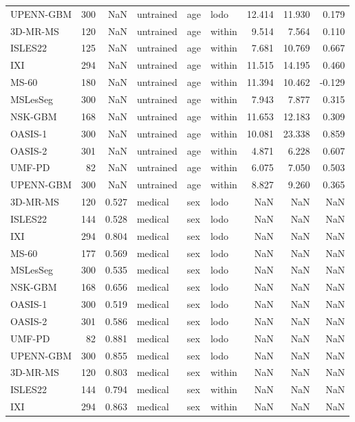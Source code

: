 \begin{tabular}{lrrlllrrr}
UPENN-GBM & 300 & NaN & untrained & age & lodo & 12.414 & 11.930 & 0.179 \\
3D-MR-MS & 120 & NaN & untrained & age & within & 9.514 & 7.564 & 0.110 \\
ISLES22 & 125 & NaN & untrained & age & within & 7.681 & 10.769 & 0.667 \\
IXI & 294 & NaN & untrained & age & within & 11.515 & 14.195 & 0.460 \\
MS-60 & 180 & NaN & untrained & age & within & 11.394 & 10.462 & -0.129 \\
MSLesSeg & 300 & NaN & untrained & age & within & 7.943 & 7.877 & 0.315 \\
NSK-GBM & 168 & NaN & untrained & age & within & 11.653 & 12.183 & 0.309 \\
OASIS-1 & 300 & NaN & untrained & age & within & 10.081 & 23.338 & 0.859 \\
OASIS-2 & 301 & NaN & untrained & age & within & 4.871 & 6.228 & 0.607 \\
UMF-PD & 82 & NaN & untrained & age & within & 6.075 & 7.050 & 0.503 \\
UPENN-GBM & 300 & NaN & untrained & age & within & 8.827 & 9.260 & 0.365 \\
3D-MR-MS & 120 & 0.527 & medical & sex & lodo & NaN & NaN & NaN \\
ISLES22 & 144 & 0.528 & medical & sex & lodo & NaN & NaN & NaN \\
IXI & 294 & 0.804 & medical & sex & lodo & NaN & NaN & NaN \\
MS-60 & 177 & 0.569 & medical & sex & lodo & NaN & NaN & NaN \\
MSLesSeg & 300 & 0.535 & medical & sex & lodo & NaN & NaN & NaN \\
NSK-GBM & 168 & 0.656 & medical & sex & lodo & NaN & NaN & NaN \\
OASIS-1 & 300 & 0.519 & medical & sex & lodo & NaN & NaN & NaN \\
OASIS-2 & 301 & 0.586 & medical & sex & lodo & NaN & NaN & NaN \\
UMF-PD & 82 & 0.881 & medical & sex & lodo & NaN & NaN & NaN \\
UPENN-GBM & 300 & 0.855 & medical & sex & lodo & NaN & NaN & NaN \\
3D-MR-MS & 120 & 0.803 & medical & sex & within & NaN & NaN & NaN \\
ISLES22 & 144 & 0.794 & medical & sex & within & NaN & NaN & NaN \\
IXI & 294 & 0.863 & medical & sex & within & NaN & NaN & NaN \\

\end{tabular}
